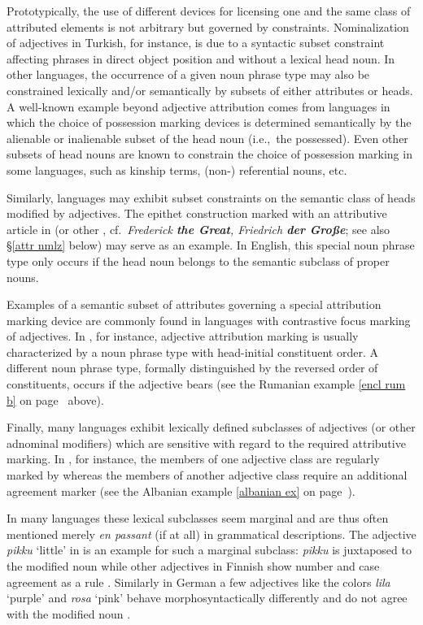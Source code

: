 Prototypically, the use of different devices for licensing one and the same class of attributed elements is not arbitrary but governed by constraints. Nominalization of adjectives in Turkish, for instance, is due to a syntactic subset constraint affecting phrases in direct object position and without a lexical head noun. In other languages, the occurrence of a given noun phrase type may also be constrained lexically and/or semantically by subsets of either attributes or heads. A well-known example beyond adjective attribution comes from languages in which the choice of possession marking devices is determined semantically by the alienable or inalienable subset of the head noun (i.e.,~the possessed). Even other subsets of head nouns are known to constrain the choice of possession marking in some languages, such as kinship terms, (non-) referential nouns, etc.

Similarly, languages may exhibit subset constraints on the semantic class of heads modified by adjectives. The epithet construction marked with an attributive article in  (or other , cf.~\textit{Frederick \textbf{the Great}, Friedrich \textbf{der Große}}; see also \S\ref{attr nmlz} below) may serve as an example. In English, this special noun phrase type only occurs if the head noun belongs to the semantic subclass of proper nouns.

Examples of a semantic subset of attributes governing a special attribution marking device are commonly found in languages with contrastive focus marking of adjectives. In , for instance, adjective attribution marking is usually characterized by a noun phrase type with head-initial constituent order. A different noun phrase type, formally distinguished by the reversed order of constituents, occurs if the adjective bears  (see the Rumanian example \ref{encl rum b} on page~\pageref{encl rum b} above).

Finally, many languages exhibit lexically defined subclasses of adjectives (or other adnominal modifiers) which are sensitive with regard to the required attributive marking. In , for instance, the members of one adjective class are regularly marked by  whereas the members of another adjective class require an additional agreement marker (see the Albanian example \ref{albanian ex} on page~\pageref{albanian synchr}).

In many languages these lexical subclasses seem marginal and are thus often mentioned merely \emph{en passant} (if at all) in grammatical descriptions. The adjective \textit{pikku} ‘little’ in  is an example for such a marginal subclass: \textit{pikku} is juxtaposed to the modified noun while other adjectives in Finnish show number and case agreement as a rule \citep[75]{karlsson1999}. Similarly in German a few adjectives like the colors \textit{lila} ‘purple’ and \textit{rosa} ‘pink’ behave morphosyntactically differently and do not agree with the modified noun \citep[cf.~also][243]{schafer2015a}.  

